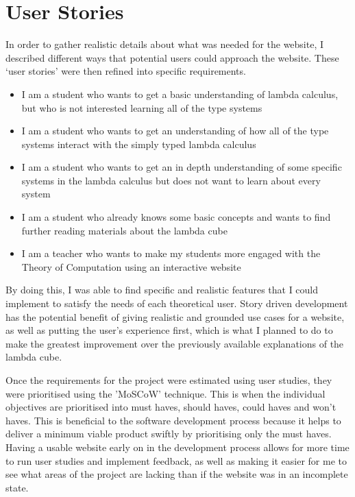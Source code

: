 \documentclass{l4proj}
\begin{document}
\section{User Stories}
In order to gather realistic details about what was needed for the website, I described different ways that potential users could approach the website.  These `user stories' were then refined into specific requirements.

\begin{itemize}
    \item 
        I am a student who wants to get a basic understanding of lambda calculus, but who is not interested learning all of the type systems

    \item
        I am a student who wants to get an understanding of how all of the type systems interact with the simply typed lambda calculus

    \item
        I am a student who wants to get an in depth understanding of some specific systems in the lambda calculus but does not want to learn about every system

    \item
        I am a student who already knows some basic concepts and wants to find further reading materials about the lambda cube
    \item 
        I am a teacher who wants to make my students more engaged with the Theory of Computation using an interactive website
\end{itemize}

By doing this, I was able to find specific and realistic features that I could implement to satisfy the needs of each theoretical user.  Story driven development has the potential benefit of giving realistic and grounded use cases for a website, as well as putting the user's experience first, which is what I planned to do to make the greatest improvement over the previously available explanations of the lambda cube. 

Once the requirements for the project were estimated using user studies, they were prioritised using the 'MoSCoW' technique.  This is when the individual objectives are prioritised into must haves, should haves, could haves and won't haves.  This is beneficial to the software development process because it helps to deliver a minimum viable product swiftly by prioritising only the must haves.  Having a usable website early on in the development process allows for more time to run user studies and implement feedback, as well as making it easier for me to see what areas of the project are lacking than if the website was in an incomplete state.  
\end{document}
